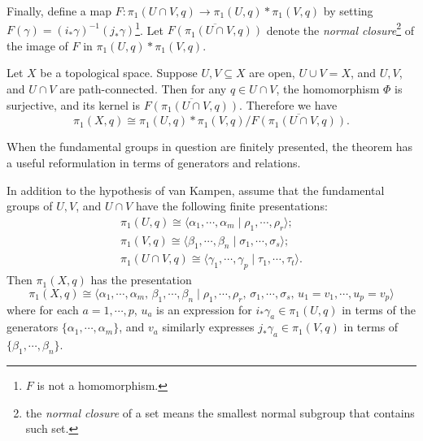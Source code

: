                         \begin{figure}[H]
                \centering
            \end{figure}
            Finally, define a map $F \colon \pi_1(U\cap V,q) \to \pi_1(U,q)*\pi_1(V,q)$ by setting $F(\gamma)=(i_*\gamma)^{-1}(j_*\gamma)$\footnote{$F$ is not a homomorphism.}. Let $\overline{F(\pi_1(U\cap V,q))}$ denote the \emph{normal closure}\footnote{the \emph{normal closure} of a set means the smallest normal subgroup that contains such set.} of the image of $F$ in $\pi_1(U,q)*\pi_1(V,q)$.

\begin{theorem}
    Let $X$ be a topological space. Suppose $U,V\subseteq X$ are open, $U\cup V=X$, and $U,V$, and $U\cap V$ are path-connected. Then for any $q\in U\cap V$, the homomorphism $\Phi$ is surjective, and its kernel is $\overline{F(\pi_1(U\cap V,q))}$. Therefore we have \[
        \pi_1(X,q)\cong \pi_1(U,q)*\pi_1(V,q) \big/ \overline{F(\pi_1(U\cap V,q))}.
    \] 
\end{theorem}
When the fundamental groups in question are finitely presented, the theorem has a useful reformulation in terms of generators and relations.
\begin{cor}
    In addition to the hypothesis of van Kampen, assume that the fundamental groups of $U,V$, and $U\cap V$ have the following finite presentations:
    \begin{gather*}
\pi_1(U,q)\cong \langle \alpha_1,\cdots,\alpha_m \mid \rho_1,\cdots,\rho_r \rangle;\\
\pi_1(V,q)\cong\langle \beta_1,\cdots,\beta_n \mid \sigma_1,\cdots,\sigma_s \rangle; \\
\pi_1(U\cap V,q)\cong \langle \gamma_1,\cdots,\gamma_p \mid \tau_1,\cdots,\tau_t \rangle .
    \end{gather*}
    Then $\pi_1(X,q)$ has the presentation \[
        \pi_1(X,q)\cong \langle \alpha_1,\cdots,\alpha_m,\,\beta_1,\cdots,\beta_n \mid \rho_1,\cdots,\rho_r,\,\sigma_1,\cdots,\sigma_s,\,u_1=v_1,\cdots,u_p=v_p \rangle 
    \] where for each $a=1,\cdots,p$, $u_a$ is an expression for $i_*\gamma_a\in \pi_1(U,q)$ in terms of the generators $\{\alpha_1,\cdots,\alpha_m\} $, and $v_a$ similarly expresses $j_*\gamma_a\in \pi_1(V,q)$ in terms of $\{\beta_1,\cdots,\beta_n\} $.
\end{cor}
